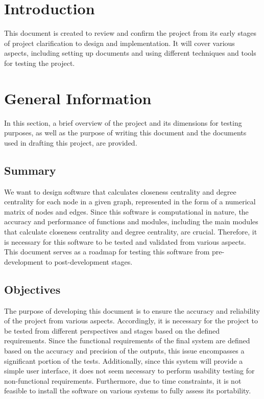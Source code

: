 \documentclass[12pt, titlepage]{article}
\begin{document}
\newpage


\section{Introduction}


This document is created to review and confirm the project from its early stages of project clarification to design and implementation. It will cover various aspects, including setting up documents and using different techniques and tools for testing the project.

\section{General Information}
In this section, a brief overview of the project and its dimensions for testing purposes, as well as the purpose of writing this document and the documents used in drafting this project, are provided.

\subsection{Summary}

We want to design software that calculates closeness centrality and degree centrality for each node in a given graph, represented in the form of a numerical matrix of nodes and edges. Since this software is computational in nature, the accuracy and performance of functions and modules, including the  main modules that calculate closeness centrality and degree centrality, are crucial. Therefore, it is necessary for this software to be tested and validated from various aspects. This document serves as a roadmap for testing this software from pre-development to post-development stages.
\subsection{Objectives}

The purpose of developing this document is to ensure the accuracy and reliability of the project from various aspects. Accordingly, it is necessary for the project to be tested from different perspectives and stages based on the defined requirements. Since the functional requirements of the final system are defined based on the accuracy and precision of the outputs, this issue encompasses a significant portion of the tests. Additionally, since this system will provide a simple user interface, it does not seem necessary to perform usability testing for non-functional requirements. Furthermore, due to time constraints, it is not feasible to install the software on various systems to fully assess its portability.
\end{document}
